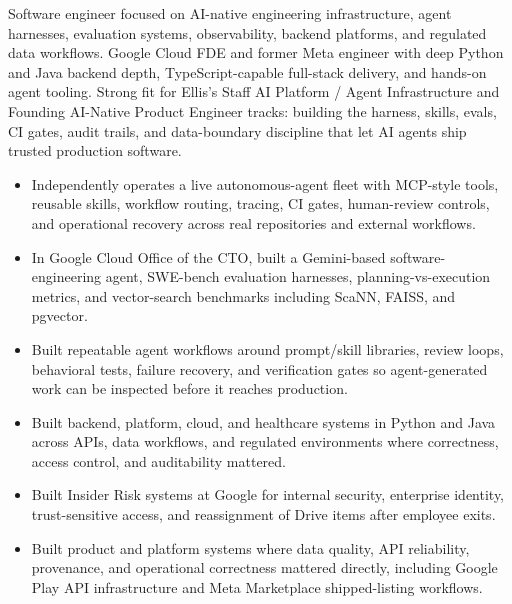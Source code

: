 


Software engineer focused on AI-native engineering infrastructure, agent harnesses, evaluation systems, observability, backend platforms, and regulated data workflows. Google Cloud FDE and former Meta engineer with deep Python and Java backend depth, TypeScript-capable full-stack delivery, and hands-on agent tooling. Strong fit for Ellis's Staff AI Platform / Agent Infrastructure and Founding AI-Native Product Engineer tracks: building the harness, skills, evals, CI gates, audit trails, and data-boundary discipline that let AI agents ship trusted production software.
\begin{itemize}
  \item Independently operates a live autonomous-agent fleet with MCP-style tools, reusable skills, workflow routing, tracing, CI gates, human-review controls, and operational recovery across real repositories and external workflows.
  \item In Google Cloud Office of the CTO, built a Gemini-based software-engineering agent, SWE-bench evaluation harnesses, planning-vs-execution metrics, and vector-search benchmarks including ScaNN, FAISS, and pgvector.
  \item Built repeatable agent workflows around prompt/skill libraries, review loops, behavioral tests, failure recovery, and verification gates so agent-generated work can be inspected before it reaches production.
\end{itemize}
\begin{itemize}
  \item Built backend, platform, cloud, and healthcare systems in Python and Java across APIs, data workflows, and regulated environments where correctness, access control, and auditability mattered.
  \item Built Insider Risk systems at Google for internal security, enterprise identity, trust-sensitive access, and reassignment of Drive items after employee exits.
  \item Built product and platform systems where data quality, API reliability, provenance, and operational correctness mattered directly, including Google Play API infrastructure and Meta Marketplace shipped-listing workflows.
\end{itemize}




